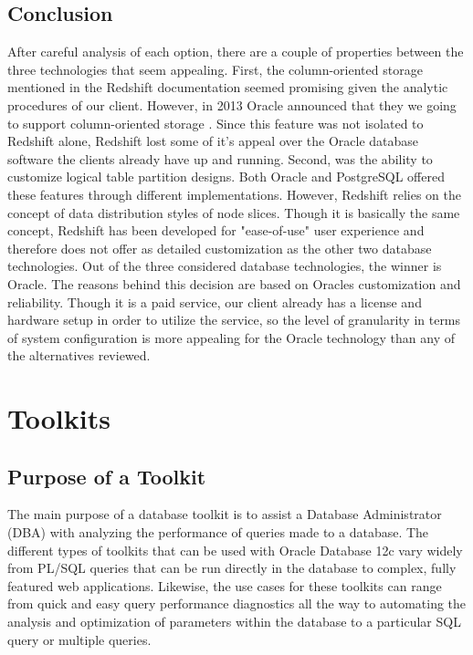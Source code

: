 \documentclass[draftclsnofoot, onecolumn, compsoc, 10pt]{IEEEtran}
\begin{document}
\subsection{Conclusion}
After careful analysis of each option, there are a couple of properties between the three technologies that seem appealing. First, the column-oriented storage mentioned in the Redshift documentation seemed promising given the analytic procedures of our client. However, in 2013 Oracle announced that they we going to support column-oriented storage \cite{Column-Oriented Makeover}. Since this feature was not isolated to Redshift alone, Redshift lost some of it's appeal over the Oracle database software the clients already have up and running. Second, was the ability to customize logical table partition designs. Both Oracle and PostgreSQL offered these features through different implementations. However, Redshift relies on the concept of data distribution styles of node slices. Though it is basically the same concept, Redshift has been developed for "ease-of-use" user experience and therefore does not offer as detailed customization as the other two database technologies. Out of the three considered database technologies, the winner is Oracle. The reasons behind this decision are based on  Oracles customization and reliability. Though it is a paid service, our client already has a license and hardware setup in order to utilize the service, so the level of granularity in terms of system configuration is more appealing for the Oracle technology than any of the alternatives reviewed. 


\section{Toolkits}
\subsection{Purpose of a Toolkit}
The main purpose of a database toolkit is to assist a Database Administrator (DBA) with analyzing the performance of queries made to a database. 
The different types of toolkits that can be used with Oracle Database 12c vary widely from PL/SQL queries that can be run directly in the database to complex, fully featured web applications. 
Likewise, the use cases for these toolkits can range from quick and easy query performance diagnostics all the way to automating the analysis and optimization of parameters within the database to a particular SQL query or multiple queries. 
\end{document}
